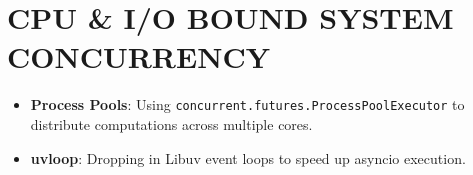 \hypertarget{cpu-io-bound-system-concurrency}{%
\chapter{CPU \& I/O BOUND SYSTEM
CONCURRENCY}\label{cpu-io-bound-system-concurrency}}

\begin{itemize}
\tightlist
\item
  \textbf{Process Pools}: Using
  \passthrough{\lstinline!concurrent.futures.ProcessPoolExecutor!} to
  distribute computations across multiple cores.
\item
  \textbf{uvloop}: Dropping in Libuv event loops to speed up asyncio
  execution.
\end{itemize}

